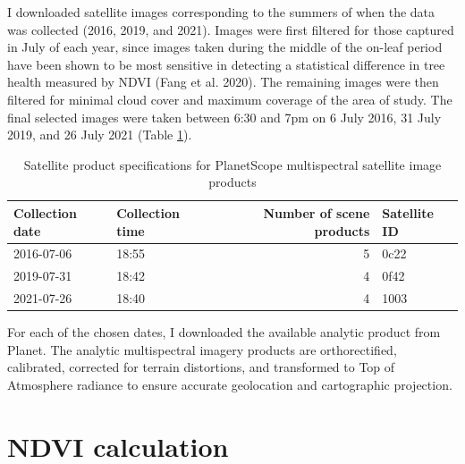 \documentclass[12pt,twoside]{reedthesis}
\begin{document}
I downloaded satellite images corresponding to the summers of when the
data was collected (2016, 2019, and 2021). Images were first filtered
for those captured in July of each year, since images taken during the
middle of the on-leaf period have been shown to be most sensitive in
detecting a statistical difference in tree health measured by NDVI
(Fang et al. 2020). The remaining images were then filtered for minimal cloud
cover and maximum coverage of the area of study. The final selected
images were taken between 6:30 and 7pm on 6 July 2016, 31 July 2019, and
26 July 2021 (Table \ref{tab:sat-products}).
\begin{longtable}[t]{llrl}
\caption[Satellite product specifications]{\label{tab:sat-products}Satellite product specifications for PlanetScope multispectral satellite image products}\\
\toprule
Collection date & Collection time & Number of scene products & Satellite ID\\
\midrule
2016-07-06 & 18:55 & 5 & 0c22\\
2019-07-31 & 18:42 & 4 & 0f42\\
2021-07-26 & 18:40 & 4 & 1003\\
\bottomrule
\end{longtable}
For each of the chosen dates, I downloaded the available analytic
product from Planet. The analytic multispectral imagery products are
orthorectified, calibrated, corrected for terrain distortions, and
transformed to Top of Atmosphere radiance to ensure accurate geolocation
and cartographic projection.

\hypertarget{ndvi-calc-methods}{%
\section{NDVI calculation}\label{ndvi-calc-methods}}
\end{document}
